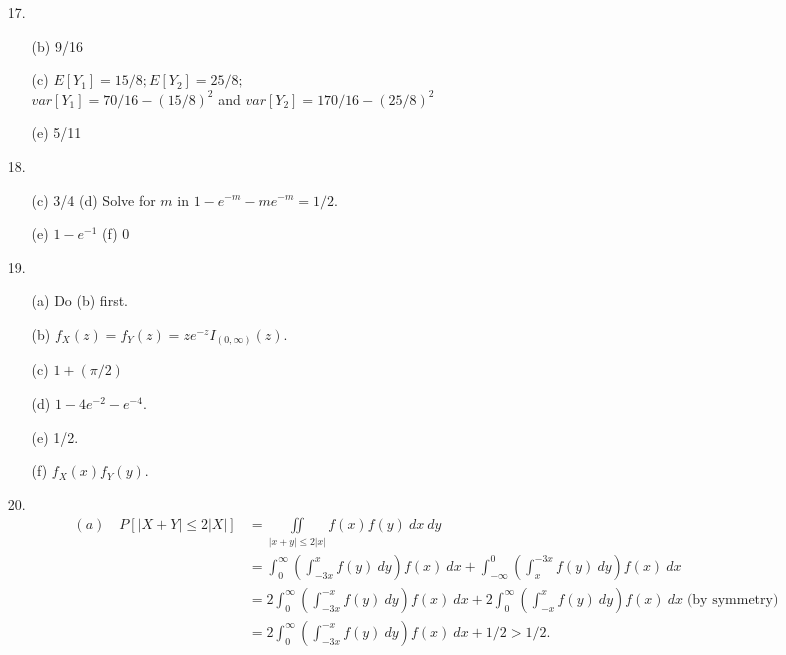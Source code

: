 \begin{enumerate}
	\item[17.] ${}$\vspace{-7.0ex} \begin{itemize}
		\item[(b)] 9/16
		\item[(c)] $E[Y_1] = 15/8; E[Y_2] = 25/8;$ \\ $var[Y_1] = 70/16 - (15/8)^2$ and $var[Y_2] = 170/16 - (25/8)^2$
		\item[(e)] 5/11
	\end{itemize}

	\item[18.] ${}$\vspace{-7.0ex} \begin{itemize}
		\item[(c)] 3/4\;\; (d) Solve for $m$ in $1 - e^{-m} - me^{-m} = 1/2.$ 
		\item[(e)] $1-e^{-1}$ \;\; (f) 0
	\end{itemize}

	\item[19.] ${}$\vspace{-7.0ex} \begin{itemize}
		\item[(a)] Do (b) first.
		\item[(b)] $f_X(z) = f_Y(z) = ze^{-z}I_{(0,\infty)}(z).$
		\item[(c)] $1 + (\pi/2)$ 
		\item[(d)] $1 - 4e^{-2} - e^{-4}.$ 
		\item[(e)] 1/2.
		\item[(f)] $f_X(x)f_Y(y).$
	\end{itemize}
	
	\newpage
	\item[20.] ${}$\vspace{-7.0ex} \begin{align*}
		(a)\quad P[\vert X + Y\vert \le 2\vert X\vert] &= \displaystyle \iint\limits_{\vert x+y\vert \le 2\vert x\vert}f(x)f(y)\ dx\ dy \\
		&= \displaystyle \int_0^\infty\left(\int_{-3x}^x f(y)\ dy\right) f(x)\ dx + \int_{-\infty}^0 \left(\int_x^{-3x} f(y)\ dy\right) f(x)\ dx \\
		&=  \displaystyle 2\int_0^\infty\left(\int_{-3x}^{-x} f(y)\ dy\right) f(x)\ dx + 2\int_0^{\infty} \left(\int_{-x}^x f(y)\ dy\right) f(x)\ dx\; \text{(by symmetry)} \\
		&= \displaystyle 2\int_0^\infty\left(\int_{-3x}^{-x} f(y)\ dy\right) f(x)\ dx + 1/2 > 1/2.
		\end{align*}


\end{enumerate}
